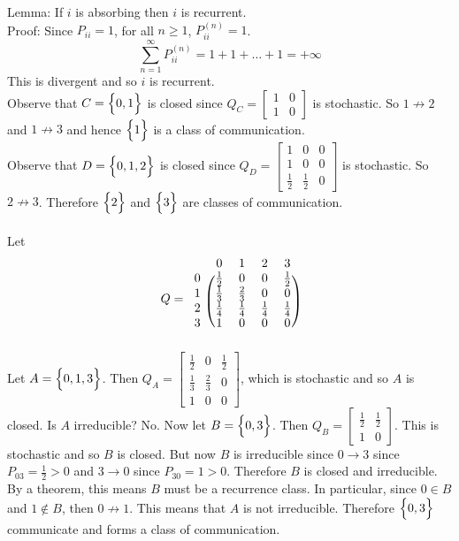 \documentclass[12pt]{article}
\begin{document}
Lemma: If $i$ is absorbing then $i$ is recurrent. \\
Proof: Since $P_{ii} = 1$, for all $n \geq 1$, $P_{ii}^{(n)} = 1$. $$ \sum_{n=1}^\infty P_{ii}^{(n)} = 1 + 1 + \dots + 1 = +\infty$$ This is divergent and so $i$ is recurrent. \\
Observe that $C = \Big\{ 0,1 \Big\}$ is closed since $Q_C = \begin{bmatrix} 1 & 0 \\ 1 & 0 \end{bmatrix}$ is stochastic. So $1 \not\to 2$ and $1 \not\to 3$ and hence $\Big\{ 1 \Big\}$ is a class of communication. \\
Observe that $D = \Big\{ 0,1,2 \Big\}$ is closed since $Q_D = \begin{bmatrix} 1 & 0 & 0 \\ 1 & 0 & 0 \\ \frac{1}{2} & \frac{1}{2} & 0 \end{bmatrix}$ is stochastic. So $2 \not\to 3$. Therefore $\Big\{ 2 \Big\}$ and $\Big\{ 3 \Big\}$ are classes of communication. \\~\\
Let $$Q = \begin{blockarray}{ccccc}
&0&1&2&3 \\
\begin{block}{c(cccc)}
0 & \frac{1}{2} & 0 & 0 & \frac{1}{2} \\
1 & \frac{1}{3} & \frac{2}{3} & 0 & 0 \\ 
2 & \frac{1}{4} & \frac{1}{4} & \frac{1}{4} & \frac{1}{4} \\ 
3 & 1 & 0 & 0 & 0 \\ \end{block} \end{blockarray} $$
Let $A = \Big\{ 0,1,3 \Big\}$. Then $Q_A = \begin{bmatrix} \frac{1}{2} & 0 & \frac{1}{2} \\ \frac{1}{3} & \frac{2}{3} & 0 \\ 1 & 0 & 0 \end{bmatrix}$, which is stochastic and so $A$ is closed. Is $A$ irreducible? No. Now let $B = \Big\{ 0,3 \Big\}$. Then $Q_B = \begin{bmatrix} \frac{1}{2} & \frac{1}{2} \\ 1 & 0 \end{bmatrix}$. This is stochastic and so $B$ is closed. But now $B$ is irreducible since $0 \to 3$ since $P_{03} = \frac{1}{2} > 0$ and $3 \to 0$ since $P_{30} = 1 > 0$. Therefore $B$ is closed and irreducible. By a theorem, this means $B$ must be a recurrence class. In particular, since $0 \in B$ and $1 \not\in B$, then $ 0 \not\to 1$. This means that $A$ is not irreducible. Therefore $\Big\{ 0,3 \Big\}$ communicate and forms a class of communication. \\
\end{document}
